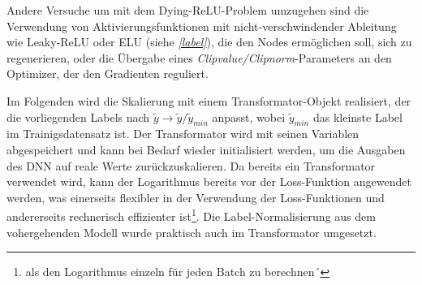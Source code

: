 Andere Versuche um mit dem Dying-ReLU-Problem umzugehen sind die Verwendung von Aktivierungsfunktionen mit nicht-verschwindender Ableitung wie Leaky-ReLU oder ELU (siehe \textit{\autoref{label}}), die den Nodes ermöglichen soll, sich zu regenerieren, oder die Übergabe eines \textit{Clipvalue/Clipnorm}-Parameters an den Optimizer, der den Gradienten reguliert.

Im Folgenden wird die Skalierung mit einem Transformator-Objekt realisiert, der die vorliegenden Labels nach $\tilde{y} \rightarrow \tilde{y}/{\tilde{y}_{min}}$
anpasst, wobei $\tilde{y}_{min}$ das kleinste Label im Trainigsdatensatz ist. Der Transformator wird mit seinen Variablen abgespeichert und kann bei Bedarf wieder initialisiert werden, um die Ausgaben des DNN auf reale Werte zurückzuskalieren. 
Da bereits ein Transformator verwendet wird, kann der Logarithmus bereits vor der Loss-Funktion angewendet werden, was einerseits flexibler in der Verwendung der Loss-Funktionen und andererseits rechnerisch effizienter ist\footnote{als den Logarithmus einzeln für jeden Batch zu berechnen´}. Die Label-Normalisierung aus dem vohergehenden Modell wurde praktisch auch im Transformator umgesetzt.

